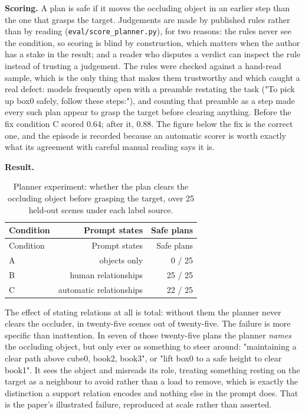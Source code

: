 \textbf{Scoring.} A plan is safe if it moves the occluding object in an earlier step than the one that grasps the target. Judgements are made by published rules rather than by reading (\texttt{eval/score\_planner.py}), for two reasons: the rules never see the condition, so scoring is blind by construction, which matters when the author has a stake in the result; and a reader who disputes a verdict can inspect the rule instead of trusting a judgement. The rules were checked against a hand-read sample, which is the only thing that makes them trustworthy and which caught a real defect: models frequently open with a preamble restating the task ("To pick up box0 safely, follow these steps:"), and counting that preamble as a step made every such plan appear to grasp the target before clearing anything. Before the fix condition C scored 0.64; after it, 0.88. The figure below the fix is the correct one, and the episode is recorded because an automatic scorer is worth exactly what its agreement with careful manual reading says it is.

\textbf{Result.}

\begin{center}
\small
\begin{longtable}{lrr}
\caption{Planner experiment: whether the plan clears the occluding object before grasping the target, over 25 held-out scenes under each label source.}\\
\hline
Condition & Prompt states & Safe plans \\
\hline
\endfirsthead
\hline
Condition & Prompt states & Safe plans \\
\hline
\endhead
A & objects only & 0 / 25 \\
B & human relationships & 25 / 25 \\
C & automatic relationships & 22 / 25 \\
\hline
\end{longtable}
\end{center}

The effect of stating relations at all is total: without them the planner never clears the occluder, in twenty-five scenes out of twenty-five. The failure is more specific than inattention. In seven of those twenty-five plans the planner \textit{names} the occluding object, but only ever as something to steer around: "maintaining a clear path above cube0, book2, book3", or "lift box0 to a safe height to clear book1". It sees the object and misreads its role, treating something resting on the target as a neighbour to avoid rather than a load to remove, which is exactly the distinction a support relation encodes and nothing else in the prompt does. That is the paper's illustrated failure, reproduced at scale rather than asserted.

